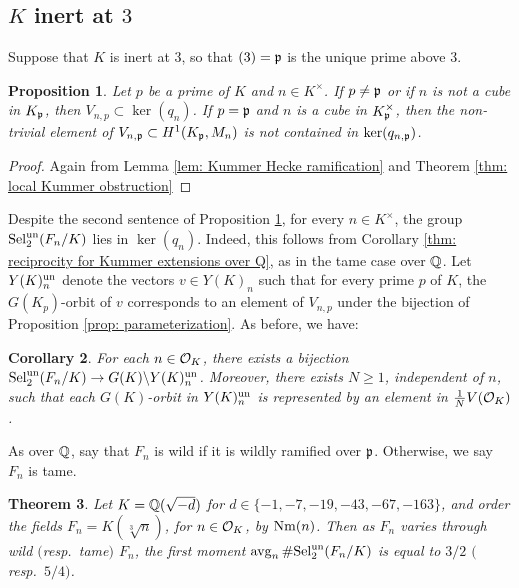 \documentclass[11pt,a4paper]{amsart}
\def\Q{{\rm \mathbb{Q}}}
\def\p{{\rm \mathfrak{p}}}
\def\O{{\rm \mathcal{O}}}
\def\Nm{{\rm Nm}}
\def\un{{\rm un}}
\def\avg{{\rm avg}}
\def\Sel{{\rm Sel}}
\numberwithin{equation}{section}
\newtheorem{theorem}{Theorem}[section]
\newtheorem{corollary}[theorem]{Corollary}
\newtheorem{proposition}[theorem]{Proposition}
\begin{document}
\subsection{$K$ inert at $3$}
Suppose that $K$ is inert at $3$, so that $(3) = \p$ is the unique prime above $3$.  
\begin{proposition}\label{prop: tame failure III}
Let $p$ be a prime of $K$ and $n \in K^\times$. If $p \neq \p$ or if $n$ is not a cube in $K_\p$, then $V_{n,p} \subset \ker(q_n)$. If $p = \p$ and $n$ is a cube in $K^\times_\p$, then the non-trivial element of $V_{n,\p} \subset H^1(K_\p, M_n)$ is not contained in $\ker(q_{n,\p})$. 
\end{proposition}
\begin{proof}
Again from Lemma \ref{lem: Kummer Hecke ramification} and Theorem \ref{thm: local Kummer obstruction}
\end{proof}


Despite the second sentence of Proposition \ref{prop: tame failure III}, for every $n \in K^\times$, the group $\Sel_2^\un(F_n/K)$ lies in $\ker(q_n)$. Indeed, this follows from Corollary \ref{thm: reciprocity for Kummer extensions over Q}, as in the tame case over $\Q$. Let $Y(K)_n^\un$ denote the vectors $v \in Y(K)_n$ such that for every prime $p$ of $K$, the $G(K_p)$-orbit of $v$ corresponds to an element of $V_{n,p}$ under the bijection of Proposition \ref{prop: parameterization}. As before, we have: 

\begin{corollary}\label{cor: Z[i] bijection}
For each $n \in \O_K$, there exists a bijection $\Sel_2^\un(F_n/K) \to G(K)\backslash Y(K)^\un_n$. Moreover, there exists $N \geq 1$,  independent of $n$, such that each $G(K)$-orbit in $Y(K)^\un_n$ is represented by an element in $\frac{1}{N}V(\O_K)$. 
\end{corollary}


As over $\Q$, say that $F_n$ is wild if it is wildly ramified over $\p$. Otherwise, we say $F_n$ is tame.


\begin{theorem}\label{thm: average over Q(i)}
    Let $K = \Q(\sqrt{-d})$ for $d \in \{-1,-7,-19,-43,-67,-163\}$, and order the fields $F_n = K(\sqrt[3]{n})$, for $n \in \O_K$,  by $\Nm(n)$. Then as $F_n$ varies through wild $($resp.\ tame$)$ $F_n$, the first moment $\avg_n \,  \#\Sel_2^\un(F_n/K)$ is equal to $3/2$ $($resp.\ $5/4)$.
\end{theorem}
\end{document}
